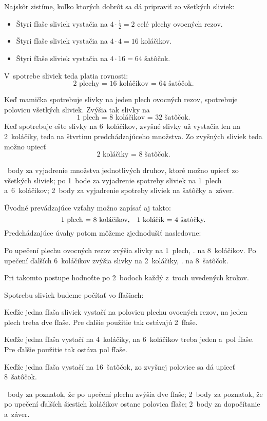 {%
Najskôr zistíme, koľko ktorých dobrôt sa dá pripraviť zo všetkých sliviek:
\begin{itemize}
\item Štyri fľaše sliviek vystačia na $4\cdot\frac12=2$ celé plechy
ovocných rezov.
\item Štyri fľaše sliviek vystačia na $4\cdot 4=16$ koláčikov.
\item Štyri fľaše sliviek vystačia na $4\cdot 16=64$ šatôčok.
\end{itemize}
\noindent
V~spotrebe sliviek teda platia rovnosti:
$$
\text{2 plechy = 16 koláčikov = 64 šatôčok.}
$$

Keď mamička spotrebuje slivky na jeden plech ovocných rezov, spotrebuje
polovicu všetkých sliviek. Zvýšia tak slivky na
$$
\text{1 plech = 8 koláčikov = 32 šatôčok.}
$$
Keď spotrebuje ešte slivky na 6~koláčikov, zvyšné slivky už vystačia len
na 2~koláčiky, teda na štvrtinu predchádzajúceho množstva. Zo zvyšných sliviek
teda možno upiecť
$$
\text{2 koláčiky = 8 šatôčok.}
$$

~body za vyjadrenie množstva jednotlivých druhov, ktoré možno upiecť zo všetkých sliviek;
po 1~bode za vyjadrenie spotreby sliviek na 1~plech a~6~koláčikov;
2~body za vyjadrenie spotreby sliviek na šatôčky a~záver.
\endhodnotenie

\poznamka
Úvodné prevádzajúce vzťahy možno zapísať aj takto:
$$
\text{1 plech = 8 koláčikov,\quad 1 koláčik = 4 šatôčky.}
$$
Predchádzajúce úvahy potom môžeme zjednodušiť nasledovne:

Po upečení plechu ovocných rezov zvýšia slivky na 1~plech, \tj. na 8~koláčikov.
Po upečení ďalších 6~koláčikov zvýšia slivky na 2~koláčiky, \tj. na 8~šatôčok.

Pri takomto postupe hodnoťte po 2~bodoch každý z~troch uvedených krokov.


\ineriesenie
Spotrebu sliviek budeme počítať vo fľašiach:

Keďže jedna fľaša sliviek vystačí na polovicu plechu ovocných rezov,
na jeden plech treba dve fľaše. Pre ďalšie použitie tak ostávajú
2~fľaše.

Keďže jedna fľaša vystačí na 4~koláčiky, na 6~koláčikov treba
jeden a~pol fľaše. Pre ďalšie použitie tak ostáva pol fľaše.

Keďže jedna fľaša vystačí na 16~šatôčok, zo zvyšnej polovice sa dá
upiecť 8~šatôčok.

~body za poznatok, že po upečení plechu zvýšia dve fľaše;
2~body za poznatok, že po upečení ďalších šiestich koláčikov ostane polovica fľaše;
2~body za dopočítanie a~záver.
\endhodnotenie}


